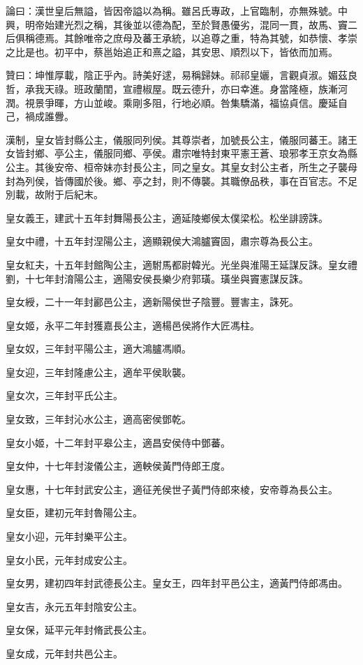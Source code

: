 \begin{pinyinscope}
論曰：漢世皇后無謚，皆因帝謚以為稱。雖呂氏專政，上官臨制，亦無殊號。中興，明帝始建光烈之稱，其後並以德為配，至於賢愚優劣，混同一貫，故馬、竇二后俱稱德焉。其餘唯帝之庶母及蕃王承統，以追尊之重，特為其號，如恭懷、孝崇之比是也。初平中，蔡邕始追正和熹之謚，其安思、順烈以下，皆依而加焉。

贊曰：坤惟厚載，陰正乎內。詩美好逑，易稱歸妹。祁祁皇孋，言觀貞淑。媚茲良哲，承我天祿。班政蘭閨，宣禮椒屋。既云德升，亦曰幸進。身當隆極，族漸河潤。視景爭暉，方山並峻。乘剛多阻，行地必順。咎集驕滿，福協貞信。慶延自己，禍成誰釁。

漢制，皇女皆封縣公主，儀服同列侯。其尊崇者，加號長公主，儀服同蕃王。諸王女皆封鄉、亭公主，儀服同鄉、亭侯。肅宗唯特封東平憲王蒼、琅邪孝王京女為縣公主。其後安帝、桓帝妹亦封長公主，同之皇女。其皇女封公主者，所生之子襲母封為列侯，皆傳國於後。鄉、亭之封，則不傳襲。其職僚品秩，事在百官志。不足別載，故附于后紀末。

皇女義王，建武十五年封舞陽長公主，適延陵鄉侯太僕梁松。松坐誹謗誅。

皇女中禮，十五年封涅陽公主，適顯親侯大鴻臚竇固，肅宗尊為長公主。

皇女紅夫，十五年封館陶公主，適駙馬都尉韓光。光坐與淮陽王延謀反誅。皇女禮劉，十七年封淯陽公主，適陽安侯長樂少府郭璜。璜坐與竇憲謀反誅。

皇女綬，二十一年封酈邑公主，適新陽侯世子陰豐。豐害主，誅死。

皇女姬，永平二年封獲嘉長公主，適楊邑侯將作大匠馮柱。

皇女奴，三年封平陽公主，適大鴻臚馮順。

皇女迎，三年封隆慮公主，適牟平侯耿襲。

皇女次，三年封平氏公主。

皇女致，三年封沁水公主，適高密侯鄧乾。

皇女小姬，十二年封平皋公主，適昌安侯侍中鄧蕃。

皇女仲，十七年封浚儀公主，適軮侯黃門侍郎王度。

皇女惠，十七年封武安公主，適征羌侯世子黃門侍郎來棱，安帝尊為長公主。

皇女臣，建初元年封魯陽公主。

皇女小迎，元年封樂平公主。

皇女小民，元年封成安公主。

皇女男，建初四年封武德長公主。皇女王，四年封平邑公主，適黃門侍郎馮由。

皇女吉，永元五年封陰安公主。

皇女保，延平元年封脩武長公主。

皇女成，元年封共邑公主。


\end{pinyinscope}
